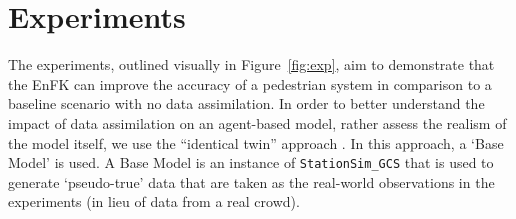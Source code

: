 \documentclass{article}
\begin{document}
\section{Experiments}\label{sec:exp}

The experiments, outlined visually in Figure~\ref{fig:exp}, aim to demonstrate that the EnFK can improve the accuracy of a pedestrian system in comparison to a baseline scenario with no data assimilation. In order to better understand the impact of data assimilation on an agent-based model, rather assess the realism of the model itself, we use the ``identical twin'' approach \citet{lueck_who_2019}. In this approach, a `Base Model' is used. A Base Model is an instance of    \texttt{StationSim\_GCS} that is used to generate `pseudo-true' data that are taken as the real-world observations in the experiments (in lieu of data from a real crowd).

\end{document}
